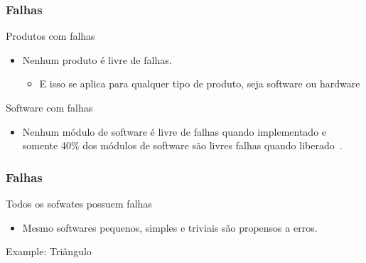 \begin{frame}[parent={cmap:software-testing-foundations}, hasprev=false, hasnext=true]
\frametitle{Falhas}
\label{concept:defect}

\begin{block:fact}{Produtos com falhas}
\begin{itemize}
    \item Nenhum produto é livre de falhas.
    \begin{itemize}
		\item E isso se aplica para qualquer tipo de produto, seja software ou hardware
    \end{itemize}
\end{itemize}

\hfill
{}
\end{block:fact}


\begin{block:fact}{Software com falhas}
\begin{itemize}
	\item Nenhum módulo de software é livre de falhas quando implementado e somente 40\% dos módulos de software são livres falhas quando liberado~\cite{shull-etal:2002}.
\end{itemize}
\hfill
{}
\end{block:fact}
\end{frame}


\begin{frame}[hasprev=true, hasnext=true]
\frametitle{Falhas}
\label{concept:defect-detection}

\begin{block:fact}{Todos os sofwates possuem falhas}
\begin{itemize}
	\item Mesmo softwares pequenos, simples e triviais são propensos a erros.
\end{itemize}
\end{block:fact}

\begin{block}{Example: Triângulo}
\centering
{}
\end{block}
\end{frame}


